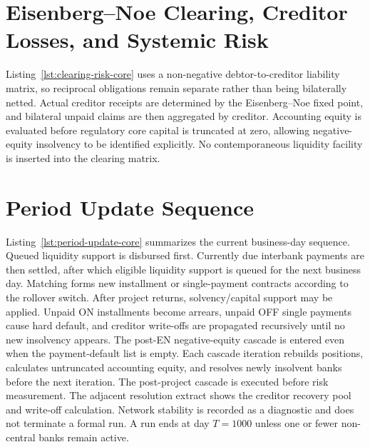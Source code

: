 

\section{Eisenberg--Noe Clearing, Creditor Losses, and Systemic Risk}

Listing~\ref{lst:clearing-risk-core} uses a non-negative debtor-to-creditor
liability matrix, so reciprocal obligations remain separate rather than being
bilaterally netted. Actual creditor receipts are determined by the
Eisenberg--Noe fixed point, and bilateral unpaid claims are then aggregated by
creditor. Accounting equity is evaluated before regulatory
core capital is truncated at zero, allowing negative-equity insolvency to be
identified explicitly. No contemporaneous liquidity facility is inserted into
the clearing matrix.



\section{Period Update Sequence}

Listing~\ref{lst:period-update-core} summarizes the current business-day
sequence. Queued liquidity support is disbursed first. Currently due interbank
payments are then settled, after which eligible liquidity support is queued
for the next business day. Matching forms new installment or single-payment
contracts according to the rollover switch. After project returns,
solvency/capital support may be applied. Unpaid ON installments become
arrears, unpaid OFF single payments cause hard default, and creditor
write-offs are propagated recursively until no new insolvency appears. The
post-EN negative-equity cascade is entered even when the payment-default
list is empty. Each cascade iteration rebuilds positions, calculates
untruncated accounting equity, and resolves newly insolvent banks before
the next iteration. The post-project cascade is executed before risk
measurement. The adjacent resolution extract shows the creditor recovery
pool and write-off calculation. Network stability is recorded as a
diagnostic and does not terminate a formal run. A run ends at day
\(T=1000\) unless one or fewer non-central banks remain active.


